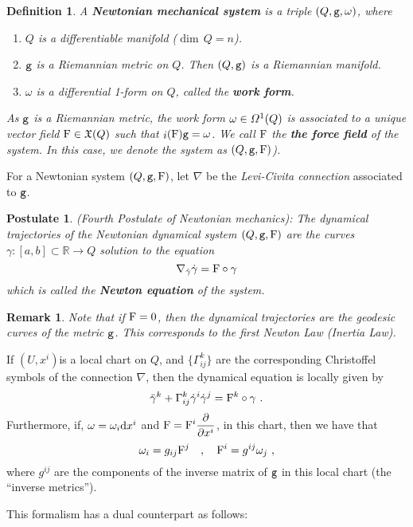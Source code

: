 \documentclass[12pt]{report}
\newtheorem{definition}[teor]{Definition}
\newtheorem{remark}[teor]{Remark}
\newtheorem{pos}[teor]{Postulate}
\def\beq{\begin{equation}}
\def\eeq{\end{equation}}
\def\ben{\begin{enumerate}}
\def\een{\end{enumerate}}
\def\dst{\displaystyle}
\def\derpar#1#2{\frac{\partial{#1}}{\partial{#2}}}
\def\df{{\mit\Omega}}
\def\d{{\rm d}}
\def\Real{\mathbb{R}}
\def\inn{\mathop{i}\nolimits}
\begin{document}
\begin{definition}
A \textbf{Newtonian mechanical system} is a triple $(Q,{\tt g},\omega)$, where
\ben
\item
$Q$ is a differentiable manifold ($\dim\, Q=n$).
\item
${\tt g}$ is a {\sl Riemannian metric} on $Q$. Then  $(Q,{\tt g})$ is a Riemannian manifold.
\item
$\omega$ is a differential 1-form on $Q$, called the \textbf{work form}.
\een
As ${\tt g}$ is a Riemannian metric, the work form $\omega\in\df^1(Q)$
is associated to a unique vector field ${\rm F}\in\mathfrak{X} (Q)$ such that
$\inn({\rm F}) {\tt g}=\omega$. We call  ${\rm F}$ the
\textbf{the force field} of the system. 
In this case, we denote the system as $(Q,{\tt g},{\rm F})$).
\end{definition}

For a Newtonian system $(Q,{\tt g},{\rm F})$, let $\nabla$ be the {\sl Levi-Civita connection} associated to ${\tt g}$.

\begin{pos}
{\rm (Fourth Postulate of Newtonian mechanics\/)}:
The dynamical trajectories of the Newtonian dynamical system
$(Q,{\tt g},{\rm F})$ are the curves $\gamma\colon[a,b]\subset\Real\to Q$
solution to the equation
\beq
\nabla_{\dot{\gamma}}\dot\gamma ={\rm F}\circ\gamma
\label{eqdin}
\eeq
which is called the \textbf{Newton equation} of the system.
\end{pos}

\begin{remark}{\rm 
Note that if ${\rm F}=0$, then the dynamical trajectories are the geodesic curves of the metric ${\tt g}$. 
This corresponds to the first Newton Law ({\sl Inertia Law\/}).
}\end{remark}

If $(U,x^i)$is a local chart on $Q$, and $\{\Gamma^k_{ij}\}$
are the corresponding Christoffel symbols of the connection $\nabla$, then the dynamical equation is locally given by
$$
\ddot\gamma^k+\Gamma_{ij}^k\dot\gamma^i\dot\gamma^j={\rm F}^k\circ\gamma \ .
$$
Furthermore, if, $\omega=\omega_i\d x^i$ and 
\(\dst {\rm F}={\rm F}^i\derpar{}{x^i}\), 
in this chart, then we have that
$$
\omega_i=g_{ij}{\rm F}^j \quad , \quad
{\rm F}^i=g^{ij}\omega_j \ ,
$$
where $g^{ij}$ are the components of the inverse matrix of ${\tt g}$ in this local chart (the ``inverse metrics'').

This formalism has a dual counterpart as follows:
\end{document}
